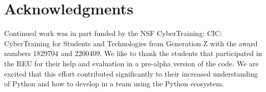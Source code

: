 
\section{Acknowledgments}\label{acknowledgments}

Continued work was in part funded by the NSF CyberTraining: CIC:
CyberTraining for Students and Technologies from Generation Z with the
award numbers 1829704 and 2200409. We like to thank the students that
participated in the REU for their help and evaluation in a pre-alpha
version of the code. We are excited that this effort contributed
significantly to their increased understanding of Python and how to
develop in a team using the Python ecosystem.
